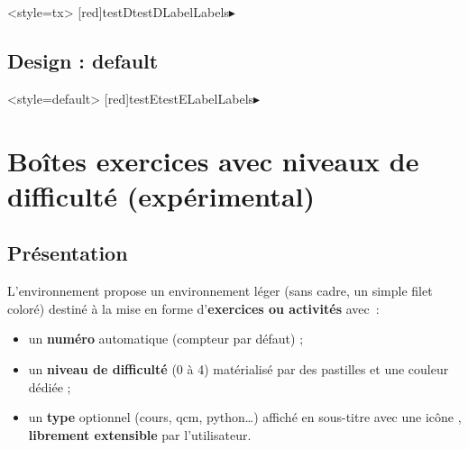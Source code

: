 \documentclass[french,11pt,a4paper]{article}
\begin{document}
\begin{demohigh}[language=latex/latex2,style/main=cyan!10,style/code=cyan!10]
\GenereBoite<style=tx>%
  [red]{testD}{testD}{Label}{Labels}{$\blacktriangleright$\,}

\begin{testD}
\lipsum[1][1-5]
\end{testD}
\end{demohigh}

\subsection{Design : default}

\begin{demohigh}[language=latex/latex2,style/main=cyan!10,style/code=cyan!10]
\GenereBoite<style=default>%
  [red]{testE}{testE}{Label}{Labels}{$\blacktriangleright$\,}

\begin{testE}
\lipsum[1][1-5]
\end{testE}
\end{demohigh}

\pagebreak

\section{Boîtes exercices avec niveaux de difficulté (expérimental)}

\subsection{Présentation}

L'environnement  propose un environnement léger (sans cadre, un simple filet coloré) destiné à la mise en forme d'\textbf{exercices ou activités} avec~:

\begin{itemize}
  \item un \textbf{numéro} automatique (compteur  par défaut) ;
  \item un \textbf{niveau de difficulté} (0 à 4) matérialisé par des pastilles
  et une couleur dédiée ;
  \item un \textbf{type} optionnel (cours, qcm, python\ldots) affiché en sous-titre avec une icône , \textbf{librement extensible} par l'utilisateur.
\end{itemize}
\end{document}
